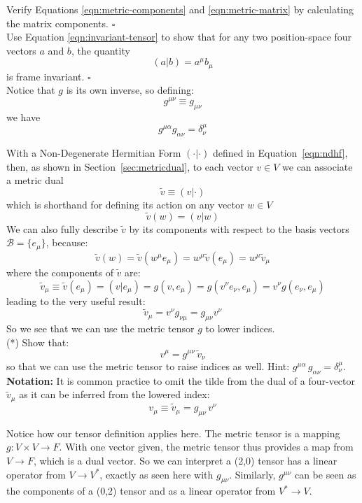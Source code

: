 \documentclass[12pt]{article}
\begin{document}
\exercise
Verify Equations \ref{eqn:metric-components} and \ref{eqn:metric-matrix} by calculating the matrix components.
 $\square$ \\[3pt]

\exercise
Use Equation \ref{eqn:invariant-tensor} to show that for any two position-space four vectors $a$ and $b$, the quantity
$$(a|b) = a^\mu b_\mu$$
is frame invariant. $\square$ \\[3pt]

\noindent
Notice that $g$ is its own inverse, so defining:
$$g^{\mu \nu} \equiv g_{\mu \nu}$$
we have
$$g^{\mu \alpha} g_{\alpha \nu}  = \delta^{\mu}_{\nu}$$

\noindent
With a Non-Degenerate Hermitian Form $(\cdot|\cdot)$ defined in Equation~\ref{eqn:ndhf}, then, as shown in Section~\ref{sec:metricdual}, to each vector $v \in V$ we can associate a metric dual
$$\tilde{v} \equiv (v|\cdot)$$
which is shorthand for defining its action on any vector $w \in V$
$$\tilde{v}(w) = (v|w)$$
We can also fully describe $\tilde{v}$ by its components with respect to the basis vectors $\mathcal{B} = \{{e_\mu}\}$, because:
$$\tilde{v}(w) = \tilde{v}(w^\mu e_\mu) = w^\mu \tilde{v}(e_\mu) = w^\mu \tilde{v}_\mu$$
where the components of $\tilde{v}$ are:
$$\tilde{v}_\mu \equiv \tilde{v}(e_\mu) = (v|e_\mu) = g(v,e_\mu) = g(v^\nu e_\nu , e_\mu)
= v^\nu g(e_\nu , e_\mu)$$
leading to the very useful result:
\begin{equation}
\tilde{v}_\mu = v^\nu g_{\nu \mu} = g_{\mu \nu} v^\nu
\end{equation}
So we see that we can use the metric tensor $g$ to lower indices.\\[3pt]

\exercise (*) Show that:
$$v^\mu = g^{\mu\nu} \, \tilde{v}_\nu$$
so that we can use the metric tensor to raise indices as well.
Hint:  $g^{\mu \alpha} \, g_{\alpha \nu}  = \delta^{\mu}_{\nu}$.\\[3pt]

\noindent
{\bf Notation: } It is common practice to omit the tilde from the
dual of a four-vector $\tilde{v}_\mu$ as it can be inferred from the
lowered index:
$${v}_\mu \equiv \tilde{v}_\mu = g_{\mu\nu} \, v^\nu$$

\noindent
Notice how our tensor definition applies here.  The metric tensor is a
mapping $g:V \times V \to F$.  With one vector given, the metric
tensor thus provides a map from $V \to F$, which is a dual vector.  So
we can interpret a (2,0) tensor has a linear operator from $V \to
V^*$, exactly as seen here with $g_{\mu\nu}$.  Similarly, $g^{\mu\nu}$
can be seen as the components of a (0,2) tensor and as a linear operator from $V^* \to V$.\\[3pt]
\end{document}
